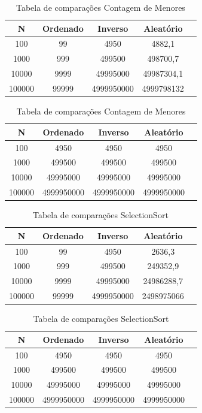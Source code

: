 \documentclass[10pt]{article}
\begin{document}
\begin{table}[H]
  \parbox{.45\linewidth}{
    \centering
    \caption{Tabela de comparações BubbleSort}
    \begin{tabular}{|c|c|c|c|c|}
    \hline
    N & Ordenado & Inverso & Aleatório \\ \hline
    100 & 99 & 4950 & 4882,1 \\ \hline
    1000 & 999 & 499500 & 498700,7 \\ \hline
    10000 & 9999 & 49995000 & 49987304,1 \\ \hline
    100000 & 99999 & 4999950000 & 4999798132 \\ \hline
    \end{tabular}
  }
  \hfill
  \parbox{.45\linewidth}{
    \centering
    \caption{Tabela de comparações Contagem de Menores}
    \begin{tabular}{|c|c|c|c|c|}
    \hline
    N & Ordenado & Inverso & Aleatório \\ \hline
    100 & 4950 & 4950 & 4950 \\ \hline
    1000 & 499500 & 499500 & 499500 \\ \hline
    10000 & 49995000 & 49995000 & 49995000 \\ \hline
    100000 & 4999950000 & 4999950000 & 4999950000 \\ \hline
    \end{tabular}
  }
\end{table}

\begin{table}[H]
  \parbox{.45\linewidth}{
    \centering
    \caption{Tabela de comparações InsertionSort}
    \begin{tabular}{|c|c|c|c|c|}
    \hline
    N & Ordenado & Inverso & Aleatório \\ \hline
    100 & 99 & 4950 & 2636,3 \\ \hline
    1000 & 999 & 499500 & 249352,9 \\ \hline
    10000 & 9999 & 49995000 & 24986288,7 \\ \hline
    100000 & 99999 & 4999950000 & 2498975066 \\ \hline
    \end{tabular}
  }
  \hfill
  \parbox{.45\linewidth}{
    \centering
    \caption{Tabela de comparações SelectionSort}
    \begin{tabular}{|c|c|c|c|c|}
    \hline
    N & Ordenado & Inverso & Aleatório \\ \hline
    100 & 4950 & 4950 & 4950 \\ \hline
    1000 & 499500 & 499500 & 499500 \\ \hline
    10000 & 49995000 & 49995000 & 49995000 \\ \hline
    100000 & 4999950000 & 4999950000 & 4999950000 \\ \hline
    \end{tabular}
  }
\end{table}
\end{document}
